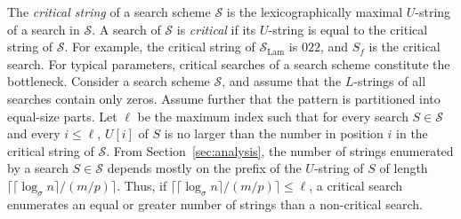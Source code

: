 \documentclass[12pt]{article}
\newcommand{\scheme}{\mathcal{S}}
\newcommand{\schemelam}{\mathcal{S}_{\text{Lam}}}
\begin{document}
The \emph{critical string} of a search scheme $\scheme$ is the
lexicographically maximal $U$-string of a search in $\scheme$.
A search of $\scheme$ is \emph{critical} if its $U$-string is equal to the
critical string of $\scheme$.
For example, the critical string of $\schemelam$ is $022$, and 
$S_f$ is the critical search. 
For typical parameters, critical searches of a search scheme constitute
the bottleneck.
Consider a search scheme $\scheme$, and assume that the $L$-strings
of all searches contain only zeros.
Assume further that the pattern is partitioned into 
equal-size parts.
Let $\ell$ be the maximum index such that for every search $S\in\scheme$
and every $i \leq \ell$, $U[i]$ of $S$ is no larger than
the number in position $i$ in the critical string of $\scheme$.
From Section~\ref{sec:analysis}, the number of strings enumerated by a search
$S\in \scheme$ depends mostly
on the prefix of the $U$-string of $S$
of length $\lceil \lceil\log_{\sigma} n\rceil/(m/p)\rceil$.
Thus, if $\lceil \lceil\log_{\sigma} n\rceil/(m/p)\rceil \leq \ell$,
a critical search enumerates an equal or greater number of strings than
a non-critical search.
\end{document}

